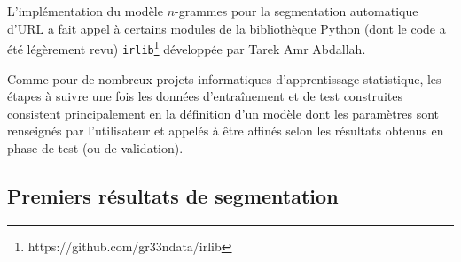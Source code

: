 \documentclass[11pt, a4paper]{article}
\begin{document}
L'implémentation du modèle $n$-grammes pour la segmentation automatique d'URL a fait appel à certains modules de la bibliothèque Python (dont le code a été légèrement revu) \texttt{irlib}\footnote{https://github.com/gr33ndata/irlib} développée par Tarek Amr Abdallah.

Comme pour de nombreux projets informatiques d'apprentissage statistique, les étapes à suivre une fois les données d'entraînement et de test construites consistent principalement en la définition d'un modèle dont les paramètres sont renseignés par l'utilisateur et appelés à être affinés selon les résultats obtenus en phase de test (ou de validation).

\subsection{Premiers résultats de segmentation}

\newpage
{}


\end{document}
